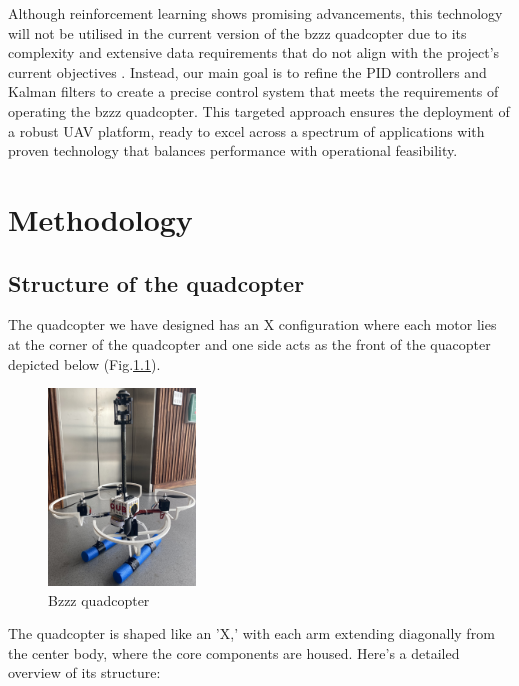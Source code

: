 \documentclass{report}
\begin{document}
Although reinforcement learning shows promising advancements, this technology
will not be utilised in the current version of the bzzz quadcopter due to its
complexity and extensive data requirements that do not align with the project's
current objectives \cite{ReinforcementLearning}. Instead, our main goal is to
refine the PID controllers and Kalman filters to create a precise control system
that meets the requirements of operating the bzzz quadcopter. This targeted
approach ensures the deployment of a robust UAV platform, ready to excel across
a spectrum of applications with proven technology that balances performance with
operational feasibility.

\chapter{Methodology}
\section{Structure of the quadcopter}
The quadcopter we have designed has an X configuration where each motor lies at
the corner of the quadcopter and one side acts as the front of the quacopter
depicted below (Fig.\ref{fig:QuadDiagram}). 

\begin{figure}[h] %
  \centering
  \includegraphics[width=0.35\textwidth]{Pictures/Quad.jpg} 
  \caption{Bzzz quadcopter}
  \label{fig:QuadDiagram}
\end{figure}

\noindent
The quadcopter is shaped like an 'X,' with each arm extending diagonally from the
center body, where the core components are housed. Here's a detailed overview of
its structure:
\end{document}
